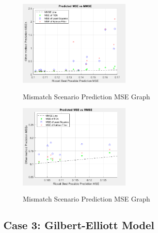 \documentclass[twocolumn,letterpaper]{IEEEAerospaceCLS}  %
\begin{document}
\begin{figure}[!h]
	\centering\includegraphics[width=0.5\textwidth]{figs/mismatchresults_all.PNG}\\
	\caption{Mismatch Scenario Prediction MSE Graph}
	\label{c2resultsall}
\end{figure}

\begin{figure}[!h]
	\centering\includegraphics[width=0.5\textwidth]{figs/mismatchresults_zoom.PNG}\\
	\caption{Mismatch Scenario Prediction MSE Graph}
	\label{c2resultszoom}
\end{figure}


\subsection{Case 3: Gilbert-Elliott Model}
\end{document}
